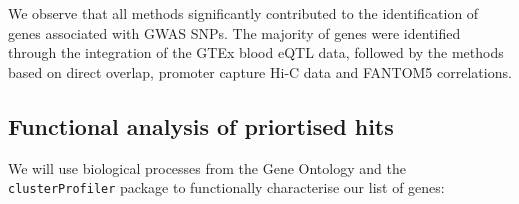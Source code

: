 \documentclass[9pt,a4paper,]{extarticle}
\newenvironment{Shaded}{\begin{snugshade}}{\end{snugshade}}
\newcommand{\KeywordTok}[1]{\textcolor[rgb]{0.13,0.29,0.53}{\textbf{#1}}}
\newcommand{\DataTypeTok}[1]{\textcolor[rgb]{0.13,0.29,0.53}{#1}}
\newcommand{\FloatTok}[1]{\textcolor[rgb]{0.00,0.00,0.81}{#1}}
\newcommand{\CharTok}[1]{\textcolor[rgb]{0.31,0.60,0.02}{#1}}
\newcommand{\StringTok}[1]{\textcolor[rgb]{0.31,0.60,0.02}{#1}}
\newcommand{\OtherTok}[1]{\textcolor[rgb]{0.56,0.35,0.01}{#1}}
\newcommand{\OperatorTok}[1]{\textcolor[rgb]{0.81,0.36,0.00}{\textbf{#1}}}
\newcommand{\NormalTok}[1]{#1}
\theoremstyle{definition}
\theoremstyle{definition}
\theoremstyle{definition}
\theoremstyle{remark}
\begin{document}
We observe that all methods significantly contributed to the identification of genes associated with GWAS SNPs.
The majority of genes were identified through the integration of the GTEx blood eQTL data, followed by the methods based on direct overlap, promoter capture Hi-C data and FANTOM5 correlations.

\subsection{Functional analysis of priortised hits}\label{functional-analysis-of-priortised-hits}

We will use biological processes from the Gene Ontology \citep{Ashburner2000} and the \texttt{clusterProfiler} package \citep{Yu2012} to functionally characterise our list of genes:

\begin{Shaded}
\end{Shaded}
\end{document}
